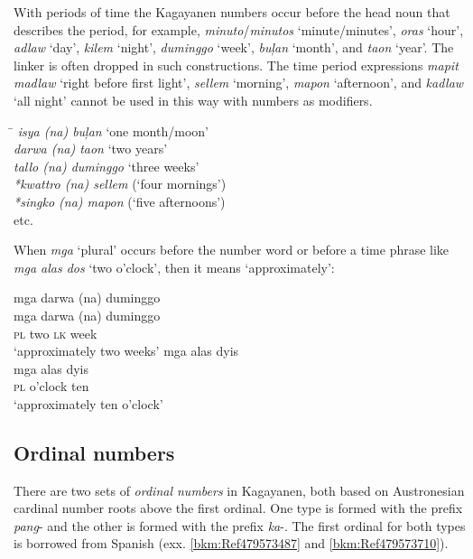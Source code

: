 With periods of time the Kagayanen numbers occur before the head noun that describes the period, for example, \textit{minuto}/\textit{minutos} ‘minute/minutes’, \textit{oras} ‘hour’, \textit{adlaw} ‘day’, \textit{kilem} ‘night’, \textit{duminggo} ‘week’, \textit{buļan} ‘month’, and \textit{taon} ‘year’. The linker is often dropped in such constructions. The time period expressions \textit{mapit madlaw} ‘right before first light’, \textit{sellem} ‘morning’, \textit{mapon} ‘afternoon’, and \textit{kadlaw} ‘all night’ cannot be used in this way with numbers as modifiers.

\ea
\begin{tabbing}
\hspace{3.5cm} \= \kill
\textit{isya (na) buļan     }\> ‘one month/moon’ \\
\textit{darwa (na) taon     }\> ‘two years’ \\
\textit{tallo (na) duminggo }\> ‘three weeks’ \\
\textit{*kwattro (na) sellem} \> (‘four mornings’) \\
\textit{*singko (na) mapon  } \> (‘five afternoons’) \\
etc.
\end{tabbing}
\z

When \textit{mga} ‘plural’ occurs before the number word or before a time phrase like \textit{mga alas dos} ‘two o’clock’, then it means ‘approximately’:

\ea
mga  darwa  (na)   duminggo \\\smallskip
 \gll mga  darwa  (na)   duminggo \\
\textsc{pl}  two  \textsc{lk}  week \\
\glt ‘approximately two weeks’
\z
\ea
mga  alas  dyis \\\smallskip
 \gll mga  alas  dyis \\
\textsc{pl}  o’clock  ten \\
\glt ‘approximately ten o’clock'
\z

\subsection{Ordinal numbers}
\label{bkm:Ref479339690} \label{sec:ordinalnumbers}  

There are two sets of \textit{ordinal numbers} in Kagayanen, both based on Austronesian cardinal number roots above the first ordinal. One type is formed with the prefix \textit{pang}{}- and the other is formed with the prefix \textit{ka}{}-. The first ordinal for both types is borrowed from Spanish (exx. \ref{bkm:Ref479573487} and \ref{bkm:Ref479573710}).

